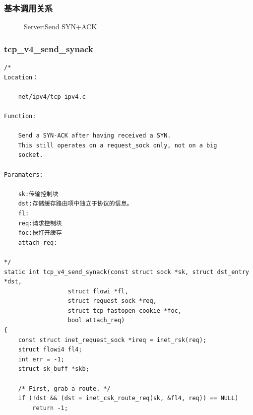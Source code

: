             \subsubsection{基本调用关系}            
                \begin{figure}[htb]        
					\caption{Server:Send SYN+ACK}
					\label{Server:Send SYN+ACK}
                \end{figure}   
            \subsubsection{tcp\_v4\_send\_synack}
				\label{ServerSendSYN+ACK:tcp_v4_send_synack}
\begin{verbatim}
/*
Location：

	net/ipv4/tcp_ipv4.c

Function: 

    Send a SYN-ACK after having received a SYN.
    This still operates on a request_sock only, not on a big
    socket.

Paramaters:

    sk:传输控制块
    dst:存储缓存路由项中独立于协议的信息。
    fl:
    req:请求控制块
    foc:快打开缓存
    attach_req:

*/
static int tcp_v4_send_synack(const struct sock *sk, struct dst_entry *dst,
                  struct flowi *fl,
                  struct request_sock *req,
                  struct tcp_fastopen_cookie *foc,
                  bool attach_req)
{
    const struct inet_request_sock *ireq = inet_rsk(req);
    struct flowi4 fl4;
    int err = -1;
    struct sk_buff *skb;

    /* First, grab a route. */
    if (!dst && (dst = inet_csk_route_req(sk, &fl4, req)) == NULL)
        return -1;
\end{verbatim}

